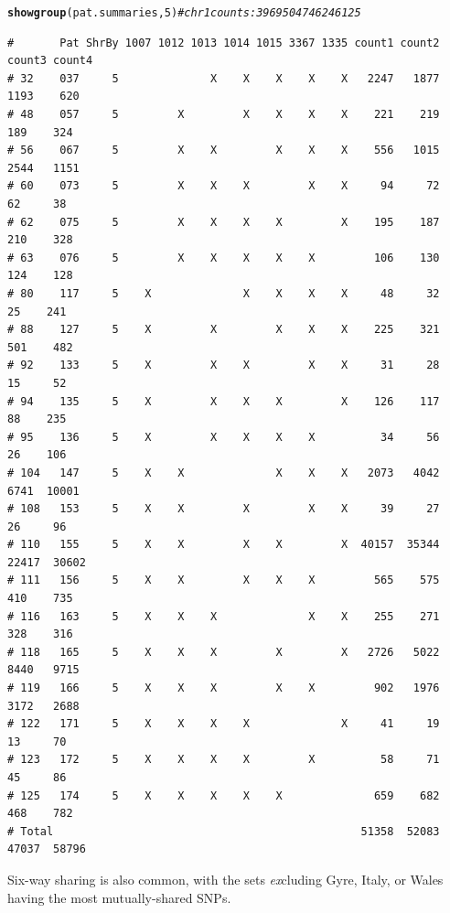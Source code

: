 \documentclass{article}\usepackage[]{graphicx}\usepackage[]{color}
\makeatletter
\newcommand{\hlnum}[1]{\textcolor[rgb]{0.686,0.059,0.569}{#1}}%
\newcommand{\hlcom}[1]{\textcolor[rgb]{0.678,0.584,0.686}{\textit{#1}}}%
\newcommand{\hlstd}[1]{\textcolor[rgb]{0.345,0.345,0.345}{#1}}%
\newcommand{\hlkwd}[1]{\textcolor[rgb]{0.737,0.353,0.396}{\textbf{#1}}}%
\newenvironment{kframe}{%
 \def\at@end@of@kframe{}%
 \ifinner\ifhmode%
  \def\at@end@of@kframe{\end{minipage}}%
  \begin{minipage}{\columnwidth}%
 \fi\fi%
 \def\FrameCommand##1{\hskip\@totalleftmargin \hskip-\fboxsep
 \colorbox{shadecolor}{##1}\hskip-\fboxsep
     \hskip-\linewidth \hskip-\@totalleftmargin \hskip\columnwidth}%
 \MakeFramed {\advance\hsize-\width
   \@totalleftmargin\z@ \linewidth\hsize
   \@setminipage}}%
 {\par\unskip\endMakeFramed%
 \at@end@of@kframe}
\newenvironment{knitrout}{}{} %
\makeatother
\begin{document}
\begin{knitrout}\footnotesize
{}\color{fgcolor}\begin{kframe}
\begin{alltt}
\hlkwd{showgroup}\hlstd{(pat.summaries,}\hlnum{5}\hlstd{)} \hlcom{# chr 1 counts: 3969   5047   4624  6125}
\end{alltt}
\begin{verbatim}
#       Pat ShrBy 1007 1012 1013 1014 1015 3367 1335 count1 count2 count3 count4
# 32    037     5              X    X    X    X    X   2247   1877   1193    620
# 48    057     5         X         X    X    X    X    221    219    189    324
# 56    067     5         X    X         X    X    X    556   1015   2544   1151
# 60    073     5         X    X    X         X    X     94     72     62     38
# 62    075     5         X    X    X    X         X    195    187    210    328
# 63    076     5         X    X    X    X    X         106    130    124    128
# 80    117     5    X              X    X    X    X     48     32     25    241
# 88    127     5    X         X         X    X    X    225    321    501    482
# 92    133     5    X         X    X         X    X     31     28     15     52
# 94    135     5    X         X    X    X         X    126    117     88    235
# 95    136     5    X         X    X    X    X          34     56     26    106
# 104   147     5    X    X              X    X    X   2073   4042   6741  10001
# 108   153     5    X    X         X         X    X     39     27     26     96
# 110   155     5    X    X         X    X         X  40157  35344  22417  30602
# 111   156     5    X    X         X    X    X         565    575    410    735
# 116   163     5    X    X    X              X    X    255    271    328    316
# 118   165     5    X    X    X         X         X   2726   5022   8440   9715
# 119   166     5    X    X    X         X    X         902   1976   3172   2688
# 122   171     5    X    X    X    X              X     41     19     13     70
# 123   172     5    X    X    X    X         X          58     71     45     86
# 125   174     5    X    X    X    X    X              659    682    468    782
# Total                                               51358  52083  47037  58796
\end{verbatim}
\end{kframe}
\end{knitrout}

Six-way sharing is also common, with the sets \emph{ex}cluding Gyre, Italy, or Wales having the most mutually-shared SNPs.
\end{document}
